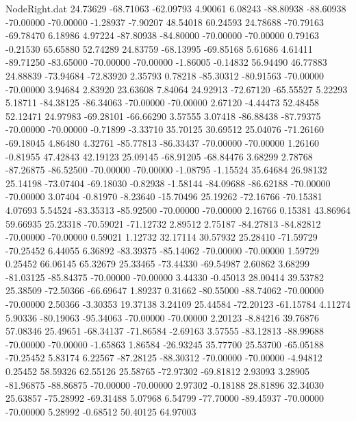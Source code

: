 \begin{filecontents}{NodeRight.dat}
  24.73629  -68.71063  -62.09793     4.90061    6.08243  -88.80938  -88.60938  -70.00000  -70.00000   -1.28937   -7.90207   48.54018   60.24593
  24.78688  -70.79163  -69.78470     6.18986    4.97224  -87.80938  -84.80000  -70.00000  -70.00000    0.79163   -0.21530   65.65880   52.74289
  24.83759  -68.13995  -69.85168     5.61686    4.61411  -89.71250  -83.65000  -70.00000  -70.00000   -1.86005   -0.14832   56.94490   46.77883
  24.88839  -73.94684  -72.83920     2.35793    0.78218  -85.30312  -80.91563  -70.00000  -70.00000    3.94684    2.83920   23.63608    7.84064
  24.92913  -72.67120  -65.55527     5.22293    5.18711  -84.38125  -86.34063  -70.00000  -70.00000    2.67120   -4.44473   52.48458   52.12471
  24.97983  -69.28101  -66.66290     3.57555    3.07418  -86.88438  -87.79375  -70.00000  -70.00000   -0.71899   -3.33710   35.70125   30.69512
  25.04076  -71.26160  -69.18045     4.86480    4.32761  -85.77813  -86.33437  -70.00000  -70.00000    1.26160   -0.81955   47.42843   42.19123
  25.09145  -68.91205  -68.84476     3.68299    2.78768  -87.26875  -86.52500  -70.00000  -70.00000   -1.08795   -1.15524   35.64684   26.98132
  25.14198  -73.07404  -69.18030    -0.82938   -1.58144  -84.09688  -86.62188  -70.00000  -70.00000    3.07404   -0.81970   -8.23640  -15.70496
  25.19262  -72.16766  -70.15381     4.07693    5.54524  -83.35313  -85.92500  -70.00000  -70.00000    2.16766    0.15381   43.86964   59.66935
  25.23318  -70.59021  -71.12732     2.89512    2.75187  -84.27813  -84.82812  -70.00000  -70.00000    0.59021    1.12732   32.17114   30.57932
  25.28410  -71.59729  -70.25452     6.44055    6.36892  -83.39375  -85.14062  -70.00000  -70.00000    1.59729    0.25452   66.06145   65.32679
  25.33465  -73.44330  -69.54987     2.60862    3.68299  -81.03125  -85.84375  -70.00000  -70.00000    3.44330   -0.45013   28.00414   39.53782
  25.38509  -72.50366  -66.69647     1.89237    0.31662  -80.55000  -88.74062  -70.00000  -70.00000    2.50366   -3.30353   19.37138    3.24109
  25.44584  -72.20123  -61.15784     4.11274    5.90336  -80.19063  -95.34063  -70.00000  -70.00000    2.20123   -8.84216   39.76876   57.08346
  25.49651  -68.34137  -71.86584    -2.69163    3.57555  -83.12813  -88.99688  -70.00000  -70.00000   -1.65863    1.86584  -26.93245   35.77700
  25.53700  -65.05188  -70.25452     5.83174    6.22567  -87.28125  -88.30312  -70.00000  -70.00000   -4.94812    0.25452   58.59326   62.55126
  25.58765  -72.97302  -69.81812     2.93093    3.28905  -81.96875  -88.86875  -70.00000  -70.00000    2.97302   -0.18188   28.81896   32.34030
  25.63857  -75.28992  -69.31488     5.07968    6.54799  -77.70000  -89.45937  -70.00000  -70.00000    5.28992   -0.68512   50.40125   64.97003

\end{filecontents}
